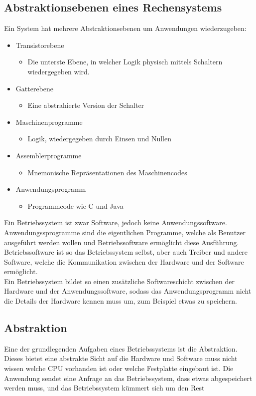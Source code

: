 \documentclass{article}
\begin{document}
	\subsection{Abstraktionsebenen eines Rechensystems}
	Ein System hat mehrere Abstraktionsebenen um Anwendungen wiederzugeben:
	\begin{itemize}
		\item{Transistorebene}
		\begin{itemize}
			\item{Die unterste Ebene, in welcher Logik physisch mittels Schaltern wiedergegeben wird.}
		\end{itemize}
		\item{Gatterebene}
		\begin{itemize}
			\item{Eine abstrahierte Version der Schalter}
		\end{itemize}
		\item{Maschinenprogramme}
		\begin{itemize}
			\item{Logik, wiedergegeben durch Einsen und Nullen}
		\end{itemize}
		\item{Assemblerprogramme}
		\begin{itemize}
			\item{Mnemonische Repräsentationen des Maschinencodes}
		\end{itemize}
		\item{Anwendungsprogramm}
		\begin{itemize}
			\item{Programmcode wie C und Java}
		\end{itemize}
	\end{itemize}
	Ein Betriebssystem ist zwar Software, jedoch keine Anwendungssoftware. Anwendungssprogramme sind die eigentlichen Programme, welche als Benutzer ausgeführt werden wollen und Betriebssoftware ermöglicht diese Ausführung. Betriebssoftware ist so das Betriebssystem selbst, aber auch Treiber und andere Software, welche die Kommunikation zwischen der Hardware und der Software ermöglicht. \\
	Ein Betriebssystem bildet so einen zusätzliche Softwareschicht zwischen der Hardware und der Anwendungssoftware, sodass das Anwendungsprogramm nicht die Details der Hardware kennen muss um, zum Beispiel etwas zu speichern. \\
	\subsection{Abstraktion}
	Eine der grundlegenden Aufgaben eines Betriebssystems ist die Abstraktion. Dieses bietet eine abstrakte Sicht auf die Hardware und Software muss nicht wissen welche CPU vorhanden ist oder welche Festplatte eingebaut ist. Die Anwendung sendet eine Anfrage an das Betriebssystem, dass etwas abgespeichert werden muss, und das Betriebssystem kümmert sich um den Rest \\
\end{document}
